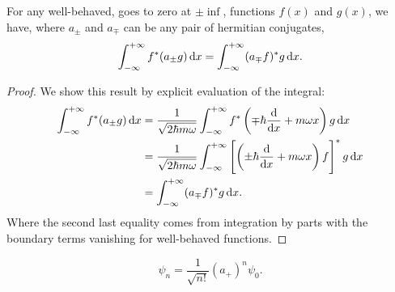 \begin{lemma}
\label{herm_conj}
For any well-behaved, \ie goes to zero at $\pm\inf$, functions $f(x)$ and $g(x)$, we have, where $a_{\pm}$ and $a_{\mp}$ can be any pair of hermitian conjugates, 
\begin{equation}
\label{eq_herm_conj}
\intinf f^*(a_{\pm}g)\dx=\intinf(a_{\mp}f)^*g\dx.
\end{equation}
\end{lemma}
\begin{proof}
We show this result by explicit evaluation of the integral:
\begin{subequations}
\begin{align}
\intinf f^*(a_{\pm}g)\dx&=\frac{1}{\sqrt{2\hbar m\omega}}\intinf f^*\left(\mp\hbar\diff{}{x}+m\omega x \right)g\dx \\
&=\frac{1}{\sqrt{2\hbar m\omega}}\intinf\left[\left(\pm\hbar\diff{}{x}+m\omega x \right)f \right]^*g\dx\\
&=\intinf(a_{\mp}f)^*g\dx.
\end{align}
\end{subequations}
Where the second last equality comes from integration by parts with the boundary terms vanishing for well-behaved functions.
\end{proof}
\begin{thrm}
\label{harm_norm}
\begin{equation}
\psi_n=\frac{1}{\sqrt{n!}}(a_+)^n\psi_0.
\end{equation}
\end{thrm}
